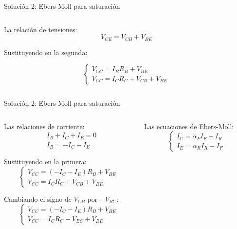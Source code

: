 \documentclass[t,aspectratio=169]{beamer}
\begin{document}
\begin{frame}{Solución 2: Ebers-Moll para saturación}
\begin{columns}
\begin{column}{0.6\textwidth}
La relación de tensiones:
\[ V_{CE} = V_{CB} + V_{BE} \]

Sustituyendo en la segunda:

\begin{equation*}
\begin{cases}
    V_{CC} = I_B R_B + V_{BE} \\
    V_{CC} = I_C R_C + V_{CB} + V_{BE}
\end{cases}
\end{equation*}

\end{column}

\end{columns}

\end{frame}


\begin{frame}{Solución 2: Ebers-Moll para saturación}

\begin{columns}

\begin{column}{0.5\textwidth}

Las relaciones de corriente:
\begin{align*}
&I_B + I_C + I_E = 0 \\
&I_B = - I_C - I_E
\end{align*}

Sustituyendo en la primera:
\begin{equation*}
\begin{cases}
    V_{CC} = (- I_C - I_E) R_B + V_{BE} \\
    V_{CC} = I_C R_C + V_{CB} + V_{BE}
\end{cases}
\end{equation*}

Cambiando el signo de $V_{CB}$ por $-V_{BC}$:
\begin{equation*}
\begin{cases}
    V_{CC} = (- I_C - I_E) R_B + V_{BE} \\
    V_{CC} = I_C R_C - V_{BC} + V_{BE}
\end{cases}
\end{equation*}

\end{column}

\begin{column}{0.5\textwidth}

Las ecuaciones de Ebers-Moll:
\begin{equation*}
\begin{cases}
I_C = \alpha_F I_F - I_R \\
I_E = \alpha_R I_R - I_F
\end{cases}
\end{equation*}


\end{column}
\end{columns}
\end{frame}
\end{document}
